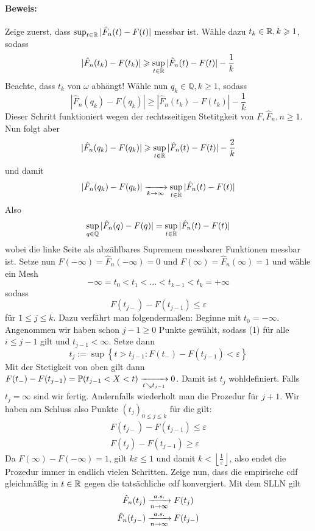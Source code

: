 \documentclass[11pt]{report}
\begin{document}
\paragraph{Beweis:} Zeige zuerst, dass $\sup_{t\in\mathbb{R}}|\hat{F}_n(t)-F(t)|$ messbar ist. W\"ahle dazu $t_k\in\mathbb{R},k\geqslant 1$, sodass 
	$$|\hat{F}_n(t_k)-F(t_k)|\geqslant\sup_{t\in\mathbb{R}}|\hat{F}_n(t)-F(t)|-\dfrac{1}{k}$$
Beachte, dass $t_k$ von $\omega$ abh\"angt! W\"ahle nun $q_k\in\mathbb{Q},k\geq1$, sodass
	$$|\hat{F}_n(q_k)-F(q_k)|\geq | \hat{F}_n(t_k)-F(t_k)|-\dfrac{1}{k}$$
Dieser Schritt funktioniert wegen der rechtsseitigen Stetitgkeit von $F,\hat{F}_n,n\geq 1$. Nun folgt aber 
	$$|\hat{F}_n(q_k)-F(q_k)|\geqslant\sup_{t\in\mathbb{R}}|\hat{F}_n(t)-F(t)|-\dfrac{2}{k}$$
und damit 
	$$|\hat{F}_n(q_k)-F(q_k)|\nto{}{k\to\infty}\sup_{t\in\R}|\hat{F}_n(t)-F(t)|$$
Also 
	$$\sup_{q\in\mathbb{Q}}|\hat{F}_n(q)-F(q)|=\sup_{t\in\mathbb{R}}|\hat{F}_n(t)-F(t)|$$
wobei die linke Seite als abz\"ahlbares Supremem messbarer Funktionen messbar ist. \newline
Setze nun $F(-\infty)=\hat{F}_n(-\infty)=0$ und $F(\infty)=\hat{F}_n(\infty)=1$ und w\"ahle ein Mesh$$-\infty=t_0<t_1<\hdots<t_{k-1}<t_k=+\infty$$
sodass 
\begin{equation}
    F(t_{j-})-F(t_{j-1})\leq\varepsilon 
\end{equation}
f\"ur $1\leq j\leq k$. Dazu verf\"ahrt man folgenderma\ss{}en:\newline
Beginne mit $t_0=-\infty$. Angenommen wir haben schon $j-1\geq 0$ Punkte gew\"ahlt, sodass (1) f\"ur alle $i\leq j-1$ gilt und $t_{j-1}<\infty$. Setze dann
    $$t_j:=\sup \left\{ t>t_{j-1}:F(t_-)-F(t_{j-1})<\varepsilon\right\}$$
Mit der Stetigkeit von oben gilt dann $F(t_-)-F(t_{j-1})=\Pp(t_{j-1}<X<t)\nto{}{t\searrow t_{j-1}}0$. Damit ist $t_j$ wohldefiniert. Falls $t_j=\infty$ sind wir fertig. Andernfalls wiederholt man die Prozedur f\"ur $j+1$. Wir haben am Schluss also Punkte $(t_j)_{0\leq j\leq k}$ f\"ur die gilt:
\begin{align*}
	F(t_{j-})-F(t_{j-1})\leq\varepsilon \\
	F(t_j)-F(t_{j-1})\geq\varepsilon
\end{align*}
Da $F(\infty)-F(-\infty)=1$, gilt $k\varepsilon\leq 1$ und damit $k<\left\lfloor\frac{1}{\varepsilon}\right\rfloor$, also endet die Prozedur immer in endlich vielen Schritten.\newline
Zeige nun, dass die empirische cdf gleichm\"a\ss{}ig in $t\in\mathbb{R}$ gegen die tats\"achliche cdf konvergiert. Mit dem SLLN gilt 
\begin{align}
    \hat{F}_n(t_j)&\nto{a.s.}{n\to\infty}F(t_j) \\
	\hat{F}_n(t_{j-})&\nto{a.s.}{n\to\infty}F(t_{j-})
\end{align}
\end{document}
